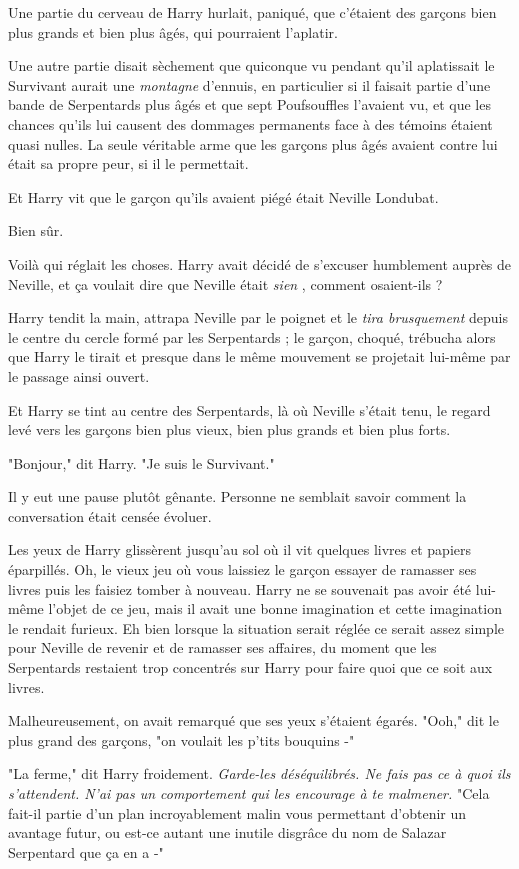 Une partie du cerveau de Harry hurlait, paniqué, que c'étaient des garçons bien plus grands et bien plus âgés, qui pourraient l'aplatir.

Une autre partie disait sèchement que quiconque vu pendant qu'il aplatissait le Survivant aurait une \emph{montagne}  d'ennuis, en particulier si il faisait partie d'une bande de Serpentards plus âgés et que sept Poufsouffles l'avaient vu, et que les chances qu'ils lui causent des dommages permanents face à des témoins étaient quasi nulles. La seule véritable arme que les garçons plus âgés avaient contre lui était sa propre peur, si il le permettait.

Et Harry vit que le garçon qu'ils avaient piégé était Neville Londubat.

Bien sûr.

Voilà qui réglait les choses. Harry avait décidé de s'excuser humblement auprès de Neville, et ça voulait dire que Neville était \emph{sien} , comment osaient-ils ?

Harry tendit la main, attrapa Neville par le poignet et le \emph{tira brusquement}  depuis le centre du cercle formé par les Serpentards ; le garçon, choqué, trébucha alors que Harry le tirait et presque dans le même mouvement se projetait lui-même par le passage ainsi ouvert.

Et Harry se tint au centre des Serpentards, là où Neville s'était tenu, le regard levé vers les garçons bien plus vieux, bien plus grands et bien plus forts.

"Bonjour," dit Harry. "Je suis le Survivant."

Il y eut une pause plutôt gênante. Personne ne semblait savoir comment la conversation était censée évoluer.

Les yeux de Harry glissèrent jusqu'au sol où il vit quelques livres et papiers éparpillés. Oh, le vieux jeu où vous laissiez le garçon essayer de ramasser ses livres puis les faisiez tomber à nouveau. Harry ne se souvenait pas avoir été lui-même l'objet de ce jeu, mais il avait une bonne imagination et cette imagination le rendait furieux. Eh bien lorsque la situation serait réglée ce serait assez simple pour Neville de revenir et de ramasser ses affaires, du moment que les Serpentards restaient trop concentrés sur Harry pour faire quoi que ce soit aux livres.

Malheureusement, on avait remarqué que ses yeux s'étaient égarés. "Ooh," dit le plus grand des garçons, "on voulait les p'tits bouquins -"

"La ferme," dit Harry froidement. \emph{Garde-les déséquilibrés. Ne fais pas ce à quoi ils s'attendent. N'ai pas un comportement qui les encourage à te malmener. } "Cela fait-il partie d'un plan incroyablement malin vous permettant d'obtenir un avantage futur, ou est-ce autant une inutile disgrâce du nom de Salazar Serpentard que ça en a -"

